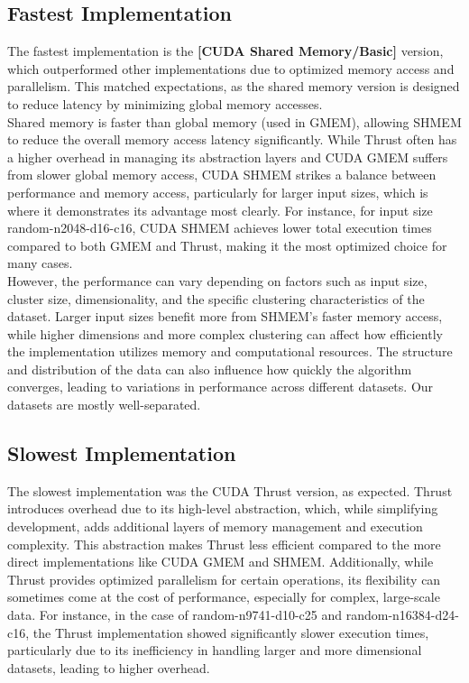 \documentclass[letterpaper,12pt]{article}
\theoremstyle{remark}
\begin{document}
\clearpage


\subsection{Fastest Implementation}
The fastest implementation is the \textbf{[CUDA Shared Memory/Basic]} version, which outperformed other implementations due to optimized memory access and parallelism. This matched expectations, as the shared memory version is designed to reduce latency by minimizing global memory accesses.\\
Shared memory is faster than global memory (used in GMEM), allowing SHMEM to reduce the overall memory access latency significantly. While Thrust often has a higher overhead in managing its abstraction layers and CUDA GMEM suffers from slower global memory access, CUDA SHMEM strikes a balance between performance and memory access, particularly for larger input sizes, which is where it demonstrates its advantage most clearly.
For instance, for input size random-n2048-d16-c16, CUDA SHMEM achieves lower total execution times compared to both GMEM and Thrust, making it the most optimized choice for many cases.\\
However, the performance can vary depending on factors such as input size, cluster size, dimensionality, and the specific clustering characteristics of the dataset. Larger input sizes benefit more from SHMEM's faster memory access, while higher dimensions and more complex clustering can affect how efficiently the implementation utilizes memory and computational resources. The structure and distribution of the data can also influence how quickly the algorithm converges, leading to variations in performance across different datasets. Our datasets are mostly well-separated.

\subsection{Slowest Implementation}
The slowest implementation was the CUDA Thrust version, as expected. Thrust introduces overhead due to its high-level abstraction, which, while simplifying development, adds additional layers of memory management and execution complexity. This abstraction makes Thrust less efficient compared to the more direct implementations like CUDA GMEM and SHMEM. Additionally, while Thrust provides optimized parallelism for certain operations, its flexibility can sometimes come at the cost of performance, especially for complex, large-scale data. For instance, in the case of random-n9741-d10-c25 and random-n16384-d24-c16, the Thrust implementation showed significantly slower execution times, particularly due to its inefficiency in handling larger and more dimensional datasets, leading to higher overhead.
\end{document}
